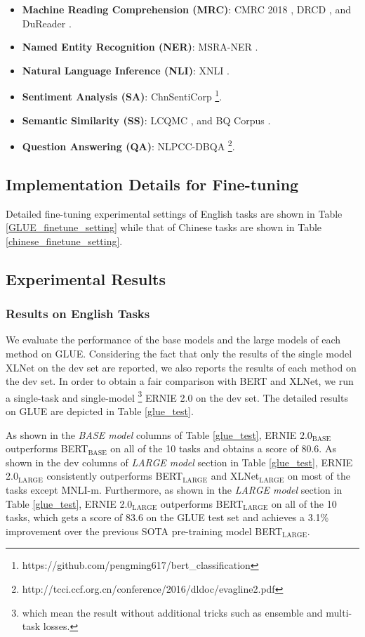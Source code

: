 \documentclass[letterpaper]{article} \usepackage{aaai20}  \usepackage{times}  \usepackage{helvet} \usepackage{courier}  \usepackage[hyphens]{url}  \usepackage{graphicx} \usepackage{makecell}
\begin{document}
\begin{itemize}
  \item \textbf{Machine Reading Comprehension (MRC)}: CMRC 2018 \cite{DBLP:journals/corr/abs-1810-07366}, DRCD \cite{shao2018drcd}, and DuReader \cite{he2017dureader}.
  \item \textbf{Named Entity Recognition (NER)}: MSRA-NER \cite{levow2006third}.
  \item \textbf{Natural Language Inference (NLI)}: XNLI \cite{conneau2018xnli}.
  \item \textbf{Sentiment Analysis (SA)}: ChnSentiCorp \footnote{https://github.com/pengming617/bert\_classification}.
  \item \textbf{Semantic Similarity (SS)}: LCQMC \cite{liu2018lcqmc}, and BQ Corpus \cite{chen2018bq}.
  \item \textbf{Question Answering (QA)}: NLPCC-DBQA \footnote{http://tcci.ccf.org.cn/conference/2016/dldoc/evagline2.pdf}.
\end{itemize}
\subsection{Implementation Details for Fine-tuning}
Detailed fine-tuning experimental settings of English tasks are shown in Table \ref{GLUE_finetune_setting} while that of Chinese tasks are shown in Table \ref{chinese_finetune_setting}.


\subsection{Experimental Results}
\subsubsection{Results on English Tasks}
We evaluate the performance of the base models and the large models of each method on GLUE. 
Considering the fact that only the results of the single model XLNet on the dev set are reported, we also reports the results of each method on the dev set. 
In order to obtain a fair comparison with BERT and XLNet, we run a single-task and single-model \footnote{which mean the result without additional tricks such as ensemble and multi-task losses.} ERNIE 2.0 on the dev set. The detailed results on GLUE are depicted in Table \ref{glue_test}. 

As shown in the \textit{BASE model} columns of Table \ref{glue_test}, ERNIE 2.0$_\text{BASE}$ outperforms BERT$_\text{BASE}$ on all of the 10 tasks and obtains a score of 80.6. As shown in the dev columns of \textit{LARGE model} section in Table \ref{glue_test}, ERNIE 2.0$_\text{LARGE}$ consistently outperforms BERT$_\text{LARGE}$ and XLNet$_\text{LARGE}$ on most of the tasks except MNLI-m. Furthermore, as shown in the \textit{LARGE model} section in Table \ref{glue_test}, ERNIE 2.0$_\text{LARGE}$ outperforms BERT$_\text{LARGE}$ on all of the 10 tasks, which gets a score of 83.6 on the GLUE test set and achieves a 3.1\% improvement over the previous SOTA pre-training model BERT$_\text{LARGE}$. 
\end{document}
